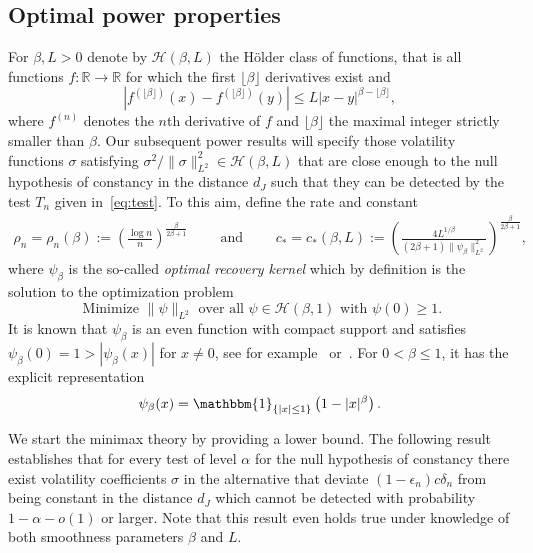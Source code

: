 \documentclass[10.5pt,letter]{article}
\numberwithin{equation}{section}
\theoremstyle{definition}
\newcommand{\R}{\mathbb{R}}
\newcommand{\1}{\mathbbm{1}}
\begin{document}
\subsection{Optimal power properties}
For $\beta,L>0$ denote by $\mathcal{H}(\beta,L)$ the H\"older class of functions, that is all functions $f:\R\rightarrow\R$ for which the first $\lfloor\beta\rfloor$ derivatives exist and
\[ \left| f^{(\lfloor \beta\rfloor)}(x) -f^{(\lfloor \beta\rfloor)}(y)\right| \leq L|x-y|^{\beta-\lfloor\beta\rfloor}, \]
where $f^{(n)}$ denotes the $n$th derivative of $f$ and $\lfloor\beta\rfloor$ the maximal integer strictly smaller than $\beta$. Our subsequent power results will specify those volatility functions $\sigma$ satisfying $\sigma^2/\|\sigma\|_{L^2}^2\in\mathcal{H}(\beta,L)$ that are close enough to the null hypothesis of constancy in the distance $d_J$ such that they can be detected by the test $T_n$ given in~\eqref{eq:test}. To this aim, define the rate and constant
\begin{align}\label{eq:optimal_constant}
    \rho_n = \rho_n(\beta):=\left(\frac{\log n}{n}\right)^{\frac{\beta}{2\beta+1}} \qquad\textrm{ and }\qquad c_* = c_*(\beta,L) :=\left( \frac{4L^{1/\beta}}{(2\beta+1)\|\psi_\beta\|_{L^2}^2}\right)^{\frac{\beta}{2\beta+1}},
\end{align} 
where $\psi_\beta$ is the so-called \textit{optimal recovery kernel} which by definition is the solution to the optimization problem
\[ \textrm{ Minimize }\|\psi\|_{L^2} \textrm{ over all } \psi\in\mathcal{H}(\beta,1)\textrm{ with } \psi(0)\geq 1.\]
It is known that $\psi_\beta$ is an even function with compact support and satisfies $\psi_\beta(0)=1>|\psi_\beta(x)|$ for $x\neq 0$, see for example~\cite{Leonov} or~\cite{Donoho}. For $0<\beta\leq 1$, it has the explicit representation
\begin{align}\label{eq:optimal_recovery_kernel}
    \psi_\beta(x) = \1_{\{|x|\leq 1\}}\left(1-|x|^\beta\right).
\end{align} 

We start the minimax theory by providing a lower bound. The following result establishes that for every test of level $\alpha$ for the null hypothesis of constancy there exist volatility coefficients $\sigma$ in the alternative that deviate $(1-\epsilon_n)c\delta_n$ from being constant in the distance $d_J$ which cannot be detected with probability $1-\alpha-o(1)$ or larger. Note that this result even holds true under knowledge of both smoothness parameters $\beta$ and $L$.
\end{document}
